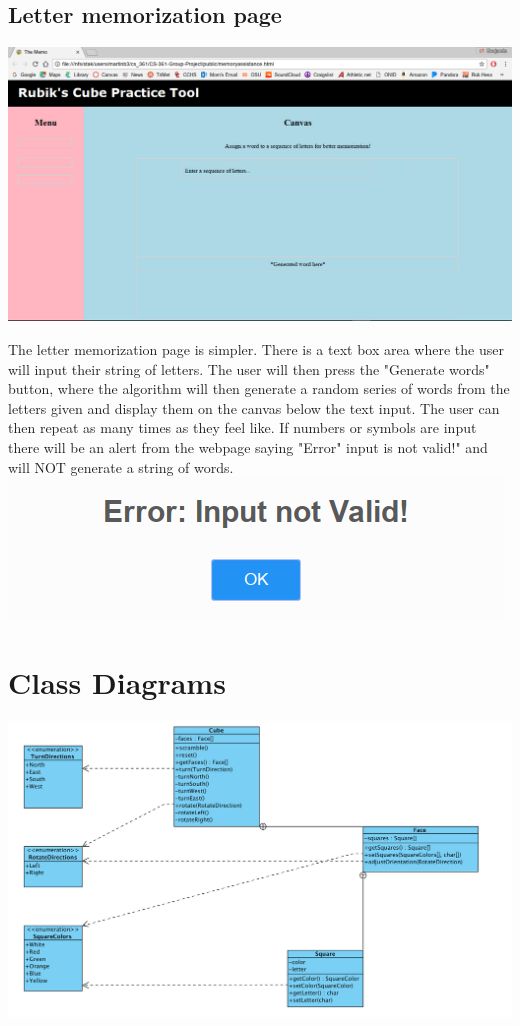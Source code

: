 \documentclass[12pt]{article}
\begin{document}
	\subsection{Letter memorization page}
	\includegraphics[width = \textwidth]{lettermem.PNG}
	\par
	The letter memorization page is simpler. There is a text box area where the user will input their string of letters. The user will then press the "Generate words" button, where the algorithm will then generate a random series of words from the letters given and display them on the canvas below the text input. The user can then repeat as many times as they feel like. If numbers or symbols are input there will be an alert from the webpage saying "Error" input is not valid!" and will NOT generate a string of words. \\

	\includegraphics[width = \textwidth]{error.PNG}

\section{Class Diagrams}

	\includegraphics[width = \textwidth]{diagram.PNG}
	
\end{document}
